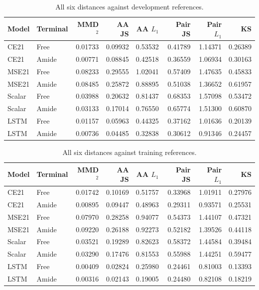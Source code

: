 \documentclass[12pt,a4paper]{article}
\begin{document}
\begin{table}[htbp]\centering\singlespacing\small
\caption{All six distances against development references.}
\begin{tabular}{llrrrrrr}\toprule
Model & Terminal & MMD$^2$ & AA JS & AA $L_1$ & Pair JS & Pair $L_1$ & KS\\\midrule
CE21 & Free & 0.01733 & 0.09932 & 0.53532 & 0.41789 & 1.14371 & 0.26389 \\
CE21 & Amide & 0.00771 & 0.08845 & 0.42518 & 0.36559 & 1.06934 & 0.30163 \\
MSE21 & Free & 0.08233 & 0.29555 & 1.02041 & 0.57409 & 1.47635 & 0.45833 \\
MSE21 & Amide & 0.08485 & 0.25872 & 0.88895 & 0.51038 & 1.36652 & 0.61957 \\
Scalar & Free & 0.03988 & 0.20632 & 0.81437 & 0.68353 & 1.57098 & 0.53472 \\
Scalar & Amide & 0.03133 & 0.17014 & 0.76550 & 0.65774 & 1.51300 & 0.60870 \\
LSTM & Free & 0.01157 & 0.05963 & 0.44325 & 0.37162 & 1.01636 & 0.20139 \\
LSTM & Amide & 0.00736 & 0.04485 & 0.32838 & 0.30612 & 0.91346 & 0.24457 \\\bottomrule
\end{tabular}\end{table}
\begin{table}[htbp]\centering\singlespacing\small
\caption{All six distances against training references.}
\begin{tabular}{llrrrrrr}\toprule
Model & Terminal & MMD$^2$ & AA JS & AA $L_1$ & Pair JS & Pair $L_1$ & KS\\\midrule
CE21 & Free & 0.01742 & 0.10169 & 0.51757 & 0.33968 & 1.01911 & 0.27976 \\
CE21 & Amide & 0.00895 & 0.09447 & 0.48963 & 0.29311 & 0.93571 & 0.25531 \\
MSE21 & Free & 0.07970 & 0.28258 & 0.94077 & 0.54373 & 1.44107 & 0.47321 \\
MSE21 & Amide & 0.09220 & 0.26188 & 0.92273 & 0.52182 & 1.39526 & 0.44118 \\
Scalar & Free & 0.03521 & 0.19289 & 0.82623 & 0.58372 & 1.44584 & 0.39484 \\
Scalar & Amide & 0.03290 & 0.17476 & 0.81553 & 0.55988 & 1.44251 & 0.59477 \\
LSTM & Free & 0.00409 & 0.02824 & 0.25980 & 0.24461 & 0.81003 & 0.13393 \\
LSTM & Amide & 0.00316 & 0.02143 & 0.19005 & 0.24480 & 0.82108 & 0.18219 \\\bottomrule
\end{tabular}\end{table}
\end{document}
